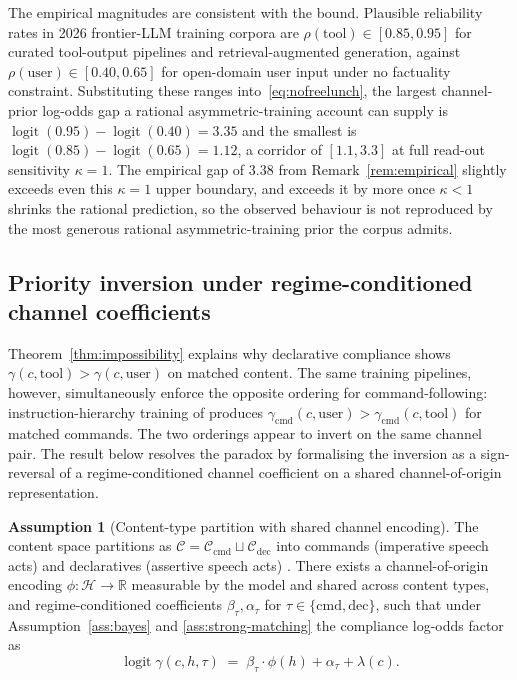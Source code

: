 \documentclass[11pt]{article}
\theoremstyle{definition}
\newtheorem{assumption}{Assumption}
\theoremstyle{remark}
\begin{document}
The empirical magnitudes are consistent with the bound. Plausible reliability
rates in 2026 frontier-LLM training corpora are $\rho(\text{tool}) \in [0.85, 0.95]$
for curated tool-output pipelines and retrieval-augmented generation, against
$\rho(\text{user}) \in [0.40, 0.65]$ for open-domain user input under no factuality
constraint. Substituting these ranges into~\eqref{eq:nofreelunch}, the largest channel-prior
log-odds gap a rational asymmetric-training account can supply is
$\operatorname{logit}(0.95) - \operatorname{logit}(0.40) = 3.35$ and the smallest is
$\operatorname{logit}(0.85) - \operatorname{logit}(0.65) = 1.12$, a corridor of
$[1.1, 3.3]$ at full read-out sensitivity $\kappa = 1$. The empirical gap of $3.38$
from Remark~\ref{rem:empirical} slightly exceeds even this $\kappa = 1$ upper
boundary, and exceeds it by more once $\kappa < 1$ shrinks the rational prediction,
so the observed behaviour is not reproduced by the most generous rational
asymmetric-training prior the corpus admits.

\subsection{Priority inversion under regime-conditioned channel coefficients}
\label{sec:priority-inversion}

Theorem~\ref{thm:impossibility} explains why declarative compliance shows
$\gamma(c, \text{tool}) > \gamma(c, \text{user})$ on matched content. The same
training pipelines, however, simultaneously enforce the opposite ordering for
command-following: instruction-hierarchy training of \cite{wallace2024instruction}
produces $\gamma_{\text{cmd}}(c, \text{user}) > \gamma_{\text{cmd}}(c, \text{tool})$
for matched commands. The two orderings appear to invert on the same channel
pair. The result below resolves the paradox by formalising the inversion as a
sign-reversal of a regime-conditioned channel coefficient on a shared
channel-of-origin representation.

\begin{assumption}[Content-type partition with shared channel encoding]
\label{ass:partition}
The content space partitions as $\mathcal{C} = \mathcal{C}_{\text{cmd}} \sqcup \mathcal{C}_{\text{dec}}$
into commands (imperative speech acts) and declaratives (assertive speech acts)
\cite{searle1969speech}. There exists a channel-of-origin encoding
$\phi : \mathcal{H} \to \mathbb{R}$ measurable by the model and shared across
content types, and regime-conditioned coefficients $\beta_\tau, \alpha_\tau$ for
$\tau \in \{\text{cmd}, \text{dec}\}$, such that under
Assumption~\ref{ass:bayes} and \ref{ass:strong-matching} the compliance log-odds
factor as
\[
\operatorname{logit} \gamma(c, h, \tau) \;=\; \beta_\tau \cdot \phi(h) + \alpha_\tau + \lambda(c).
\]
\end{assumption}
\end{document}
